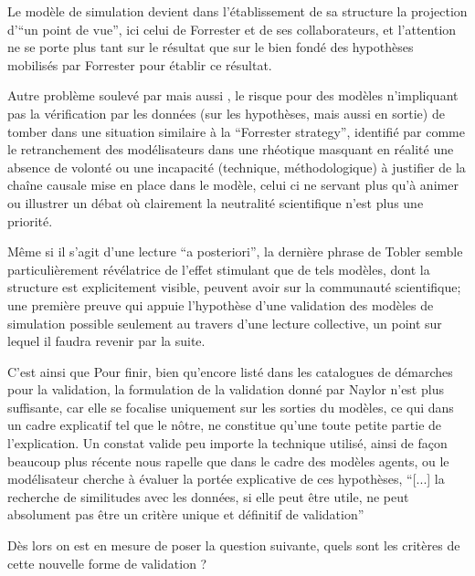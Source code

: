 Le modèle de simulation devient dans l'établissement de sa structure la projection d'\enquote{un point de vue}, ici celui de Forrester et de ses collaborateurs, et l'attention ne se porte plus tant sur le résultat que sur le bien fondé des hypothèses mobilisés par Forrester pour établir ce résultat. 

Autre problème soulevé par \textcite{Tobler1970a} mais aussi \textcite{Batty2001}, le risque pour des modèles n'impliquant pas la vérification par les données (sur les hypothèses, mais aussi en sortie) de tomber dans une situation similaire à la \foreignquote{english}{Forrester strategy}, identifié par \textcite[7-8]{Batty2001} comme le retranchement des modélisateurs dans une rhéotique masquant en réalité une absence de volonté ou une incapacité (technique, méthodologique) à justifier de la chaîne causale mise en place dans le modèle, celui ci ne servant plus qu'à animer ou illustrer un débat où clairement la neutralité scientifique n'est plus une priorité.

Même si il s'agit d'une lecture \foreignquote{latin}{a posteriori}, la dernière phrase de Tobler semble particulièrement révélatrice de l'effet stimulant que de tels modèles, dont la structure est explicitement visible, peuvent avoir sur la communauté scientifique; une première preuve qui appuie l'hypothèse d'une validation des modèles de simulation possible seulement au travers d'une lecture collective, un point sur lequel il faudra revenir par la suite.


C'est ainsi que 
Pour finir, bien qu'encore listé dans les catalogues de démarches pour la validation, la formulation de la validation donné par Naylor n'est plus suffisante, car elle se focalise uniquement sur les sorties du modèles, ce qui dans un cadre explicatif tel que le nôtre, ne constitue qu'une toute petite partie de l'explication. Un constat valide peu importe la technique utilisé, ainsi de façon beaucoup plus récente \textcite[106]{Amblard2006} nous rapelle que dans le cadre des modèles agents, ou le modélisateur cherche à évaluer la portée explicative de ces hypothèses, \enquote{[...] la recherche de similitudes avec les données, si elle peut être utile, ne peut absolument pas être un critère unique et définitif de validation}

Dès lors on est en mesure de poser la question suivante, quels sont les critères de cette nouvelle forme de validation ?

